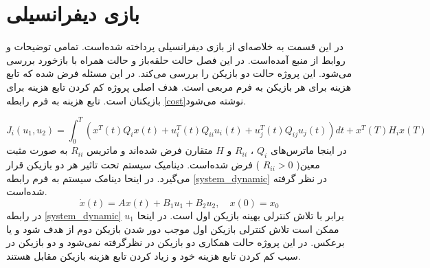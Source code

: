 \chapter{بازی دیفرانسیلی}
در این قسمت به خلاصه‌ای از بازی دیفرانسیلی پرداخته شده‌است. تمامی توضیحات و روابط  از منبع 
 \cite{article1}
 آمده‌است. در این فصل حالت حلقه‌باز و حالت همراه با بازخورد بررسی می‌شود.
 این پروژه حالت دو بازیکن را بررسی می‌کند. در این مسئله فرض شده  که تابع هزینه برای هر بازیکن به فرم مربعی است. 	هدف اصلی پروژه کم کردن تابع هزینه برای بازیکنان است. تابع هزینه به فرم رابطه \ref{cost}نوشته می‌شود.

 \begin{equation}\label{cost}
 	J_i(u_1, u_2) = \int_{0}^{T}\left( x ^T(t) Q_i x(t)+
 	 u_i ^T(t) Q_{ii} u_i(t)+
 	 u_j ^T(t) Q_{ij} u_j(t)
 	\right)dt+
 	 x ^T(T) H_i x(T) 
  \end{equation}
در اینجا ماترس‌های 
$Q_i$ ، $R_{ii}$
و
$H$
متقارن فرض شده‌اند و ماتریس 
$R_{ii}$
به صورت مثبت معین(
$R_{ii}>0$
)
فرض شده‌است.
دینامیک سیستم تحت تاثیر هر دو بازیکن قرار می‌گیرد. در اینحا دینامک سیستم به فرم رابطه \ref{system_dynamic} در نظر گرفته شده‌است.
\begin{equation}\label{system_dynamic}
	\dot x(t) = Ax(t) + B_1u_1 + B_2u_2, \quad x(0) = x_0
\end{equation}
در رابطه 
\ref{system_dynamic}
$u_1$
برابر با تلاش کنترلی بهینه بازیکن اول است. در اینحا ممکن است تلاش کنترلی بازیکن اول موجب دور شدن بازیکن دوم از هدف شود و یا برعکس. در این پروژه حالت همکاری دو بازیکن در نظرگرفته نمی‌شود و دو بازیکن در سبب کم کردن تابع هزینه خود و زیاد کردن تابع هزینه بازیکن مقابل هستند.